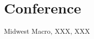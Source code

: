 
\section{Conference} %
\label{sec:conference}
\vspace{-0.25in}
\begin{outerlist}
	\item 	 Midwest Macro, XXX, XXX 
\end{outerlist}

